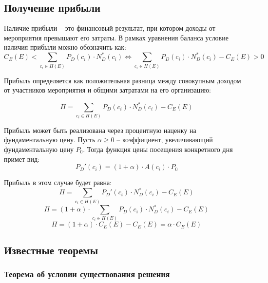 \subsection{Получение прибыли}

Наличие прибыли -- это финансовый результат, при котором доходы от мероприятия превышают его затраты. В рамках уравнения баланса условие наличия прибыли можно обозначить как:
\begin{equation}
	C_E(E) < \sum_{c_i \in H(E)}{P_D(c_i) \cdot N_D^*(c_i)} \Leftrightarrow \sum_{c_i \in H(E)}{P_D(c_i) \cdot N_D^*(c_i)} - C_E(E) > 0
\end{equation}

Прибыль определяется как положительная разница между совокупным доходом от участников мероприятия и общими затратами на его организацию:

\begin{equation}
	\Pi = \sum_{c_i \in H(E)}{P_D(c_i) \cdot N_D^*(c_i)} - C_E(E)
\end{equation}

Прибыль может быть реализована через процентную наценку на фундаментальную цену. Пусть $\alpha \ge 0$ -- коэффициент, увеличивающий фундаментальную цену $P_0$. Тогда функция цены посещения конкретного дня примет вид:
\begin{equation}
	P_D'(c_i) = (1 + \alpha) \cdot A(c_i) \cdot P_0
\end{equation}

Прибыль в этом случае будет равна:
\begin{equation}
	\Pi = \sum_{c_i \in H(E)}{P_D'(c_i) \cdot N_D^*(c_i)} - C_E(E) 
\end{equation}
\begin{equation}
	\Pi = (1 + \alpha) \cdot \sum_{c_i \in H(E)}{P_D(c_i) \cdot N_D^*(c_i)} - C_E(E)
\end{equation}
\begin{equation}
	\Pi = (1 + \alpha) \cdot C_E(E) - C_E(E) = \alpha \cdot C_E(E)
\end{equation}

\subsection{Известные теоремы}

\subsubsection{Теорема об условии существования решения}

